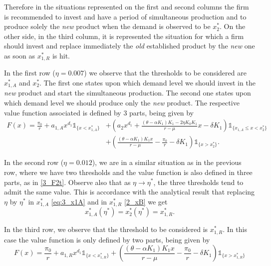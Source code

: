 Therefore in the situations represented on the first and second columns the firm is recommended to 
invest and have a period of simultaneous production and to produce solely the \textit{new} product when the demand is observed to be $x^*_2$.
On the other side, in the third column, it is represented the situation for which a firm should invest and replace immediately the \textit{old} established product by the \textit{new} one as soon as $x^*_{1,R}$ is hit.

In the first row ($\eta=0.007$) we observe that the thresholds to be considered are $x_{1,A}^*$ and $x_2^*$. The first one states upon which demand level we should invest in the \textit{new} product and start the simultaneous production. The second one states upon which demand level we should produce only the \textit{new} product. The respective value function associated is defined by 3 parts, being given by 
\begin{equation}
\begin{split}
F(x)=\frac{\pi_0}{r}+
	a_{1,A}x^{d_1}  \mathds{1}_{ \{x<x^*_{1,A} \}}&+
	\left( a_2x^{d_1}+\frac{(\theta-\alpha K_1)K_1-2 \eta K_0 K_1}{r-\mu} x - \delta K_1 \right)  \mathds{1}_{ \{ x_{1,A} \leq x < x_2^* \}}\\
	&+
	\left(  \frac{(\theta-\alpha K_1)K_1 x}{r-\mu} -\frac{\pi_0}{r} - \delta K_1 \right)   \mathds{1}_{ \{ x>x_2^*  \} }.
\end{split}
	\label{3_F2t}
\end{equation}	

In the second row ($\eta=0.012$), we are in a similar situation as in the previous row, where we have two thresholds and the value function is also defined in three parts, as in \eqref{3_F2t}.
Observe also that as $\eta \to \eta^*$, the three thresholds tend to admit the same value. This is accordance with the analytical result that replacing $\eta$ by $\eta^*$ in $x^*_{1,A}$ \eqref{eq:3_x1A} and in $x^*_{1,R}$ \eqref{2_xB} we get
$$x^*_{1,A}(\eta^*)=x_2^*(\eta^*)=x^*_{1,R}.$$


In the third row, we observe that the threshold to be considered is $x_{1,R}^*$. In this case the value function is only defined by two parts, being given by
$$F(x)=\frac{\pi_0}{r}+
	a_{1,R}x^{d_1} \mathds{1}_{ \{ x<x_{1,R}^* \} }+
	\left(  \frac{(\theta-\alpha K_1)K_1 x}{r-\mu} -\frac{\pi_0}{r} - \delta K_1 \right)  \mathds{1}_{ \{ x>x_{1,R}^* \} }$$

